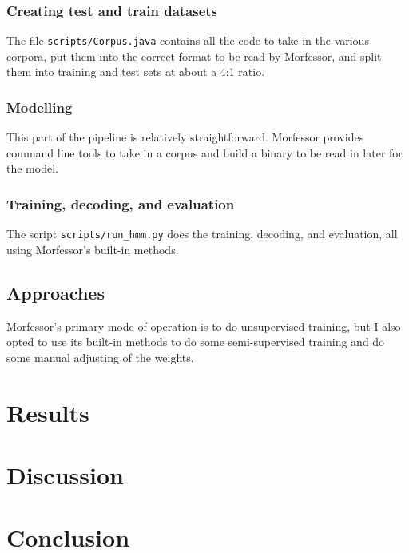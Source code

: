 \documentclass[10pt]{article}
\begin{document}
\subsubsection{Creating test and train datasets}
The file \texttt{scripts/Corpus.java} contains all the code to take in the various corpora, put them into the correct format to be read by Morfessor, and split them into training and test sets at about a 4:1 ratio.

\subsubsection{Modelling}
This part of the pipeline is relatively straightforward. Morfessor provides command line tools to take in a corpus and build a binary to be read in later for the model.

\subsubsection{Training, decoding, and evaluation}
The script \texttt{scripts/run\_hmm.py} does the training, decoding, and evaluation, all using Morfessor's built-in methods.

\subsection{Approaches}
Morfessor's primary mode of operation is to do unsupervised training, but I also opted to use its built-in methods to do some semi-supervised training and do some manual adjusting of the weights.

\section{Results}

\section{Discussion}

\section{Conclusion}

\pagebreak


\end{document}
